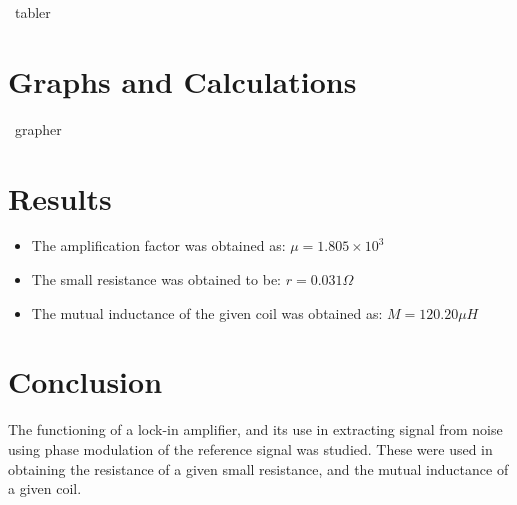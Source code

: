 \documentclass[a4paper]{article}
\begin{document}
~tabler~



\section*{Graphs and Calculations}

~grapher~

\section*{Results}

\begin{itemize}
	\item The amplification factor was obtained as: $\mu = 1.805 \times 10^3$
	\item The small resistance was obtained to be: $r =0.031\Omega$
	\item The mutual inductance of the given coil was obtained as: $M = 120.20 \mu H$
\end{itemize}

\section*{Conclusion}

The functioning of a lock-in amplifier, and its use in extracting signal from noise using phase modulation of the reference signal was studied. These were used in obtaining the resistance of a given small resistance, and the mutual inductance of a given coil.
\end{document}
